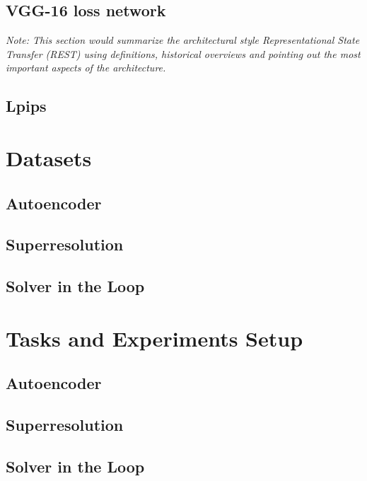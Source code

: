 \documentclass[a4paper,12pt,twoside]{report}
\begin{document}
\section{VGG-16 loss network}

\textit{Note: This section would summarize the architectural style Representational State Transfer (REST) using definitions, historical overviews and pointing out the most important aspects of the architecture.}

\section{Lpips}





\chapter{Datasets}

\section{Autoencoder}


\section{Superresolution}

\section{Solver in the Loop}






\chapter{Tasks and Experiments Setup}

\section{Autoencoder}

\section{Superresolution}

\section{Solver in the Loop}
\end{document}

